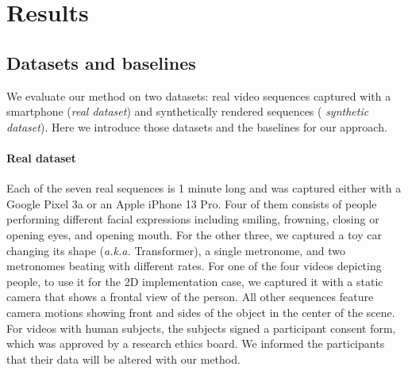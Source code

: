 

\section{Results}
  \label{sec:conerf-results}

  \subsection{Datasets and baselines}

    We evaluate our method on two datasets: real video sequences captured with a
    smartphone ({\it real dataset}) and synthetically rendered sequences ({\it
        synthetic dataset}).
    Here we introduce those datasets and the baselines for our approach.

    \paragraph{Real dataset}
      Each of the seven real sequences is 1 minute long and was captured either with
      a Google Pixel 3a or an Apple iPhone 13 Pro.
      Four of them consists of people performing different facial expressions
      including smiling, frowning, closing or opening eyes, and opening mouth.
      For the other three, we captured a toy car changing its shape ({\it a.k.a.
        }
      Transformer), a single metronome, and two metronomes beating with different
      rates.
      For one of the four videos depicting people, to use it for the 2D
      implementation case, we captured it with a static camera that shows a frontal
      view of the person.
      All other sequences feature camera motions showing front and sides of the
      object in the center of the scene.
      For videos with human subjects, the subjects signed a participant consent
      form, which was approved by a research ethics board.
      We informed the participants that their data will be altered with our method.

